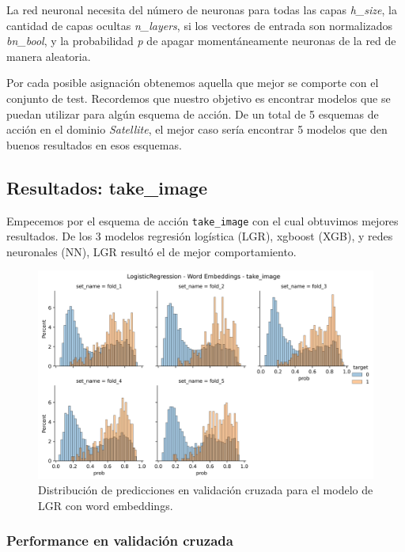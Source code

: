 La red neuronal necesita del número de neuronas para todas las capas
\emph{h\_size}, la cantidad de capas ocultas \emph{n\_layers}, si los vectores
de entrada son normalizados \emph{bn\_bool}, y la probabilidad \emph{p} de
apagar momentáneamente neuronas de la red de manera aleatoria.

Por cada posible asignación obtenemos aquella que mejor se comporte con el
conjunto de test. Recordemos que nuestro objetivo es encontrar modelos que se
puedan utilizar para algún esquema de acción. De un total de 5 esquemas de
acción en el dominio \emph{Satellite}, el mejor caso sería encontrar 5 modelos
que den buenos resultados en esos esquemas.

\subsection{Resultados: take\_image}

Empecemos por el esquema de acción \verb|take_image| con el cual obtuvimos
mejores resultados. De los 3 modelos regresión logística (LGR), xgboost (XGB), y
redes neuronales (NN), LGR resultó el de mejor comportamiento.

\begin{figure}[t!]
    \centering
    \includegraphics[width=\linewidth]{figures/results/word_embeddings/lgr/take_image/lgr_wb_take_image.png}
    \caption{Distribución de predicciones en validación cruzada para el modelo de LGR con word embeddings.}
    \label{fig:takeimage-bestmodel-distplot}
\end{figure}

\subsubsection{Performance en validación cruzada}

